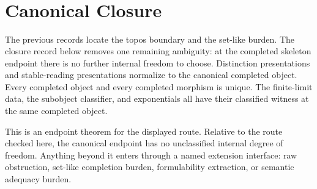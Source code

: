 \documentclass[11pt]{article}
\begin{document}
\begin{code}
\>[0][@{}l@{\AgdaIndent{0}}]%
\>[2]\AgdaSymbol{\{}\AgdaSpace{}%
%
\>[29]\AgdaSymbol{=}\AgdaSpace{}%
\<%
\\
%
\>[2]\AgdaSymbol{;}\AgdaSpace{}%
%
\>[29]\AgdaSymbol{=}\AgdaSpace{}%
\<%
\\
%
\>[2]\AgdaSymbol{;}\AgdaSpace{}%
%
\>[29]\AgdaSymbol{=}\AgdaSpace{}%
\<%
\\
%
\>[2]\AgdaSymbol{;}\AgdaSpace{}%
\AgdaSpace{}%
\AgdaSymbol{=}\AgdaSpace{}%
\<%
\\
%
\>[2]\AgdaSymbol{\}}\<%
\end{code}

\section{Canonical Closure}

The previous records locate the topos boundary and the set-like burden.
The closure record below removes one remaining ambiguity: at the
completed skeleton endpoint there is no further internal freedom to
choose.  Distinction presentations and stable-reading presentations
normalize to the canonical completed object.  Every completed object and
every completed morphism is unique.  The finite-limit data, the
subobject classifier, and exponentials all have their classified witness
at the same completed object.

This is an endpoint theorem for the displayed route.  Relative to the
route checked here, the canonical endpoint has no unclassified internal
degree of freedom.  Anything beyond it enters through a named extension
interface: raw obstruction, set-like completion burden, formulability
extraction, or semantic adequacy burden.
\end{document}
